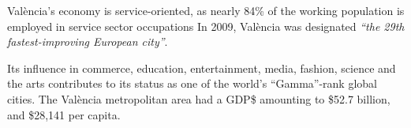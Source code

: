 \documentclass{article}
\begin{document}

Val\`{e}ncia's economy is service-oriented, as nearly 84\% of the working population
is employed in service sector occupations In 2009, Val\`{e}ncia was designated \emph{``the
29th fastest-improving European city''}.  

Its influence in commerce, education, entertainment, media, fashion, science
and the arts contributes to its status as one of the world's ``Gamma''-rank
global cities. The Val\`{e}ncia metropolitan area had a GDP\$ amounting to \$52.7
billion, and \$28,141 per capita.
\end{document}
